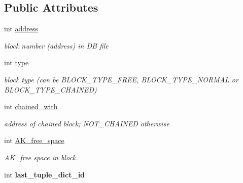 \subsection*{Public Attributes}
\begin{DoxyCompactItemize}
\item 
\mbox{\label{structAK__block_a72691b8b4db638181adadd02c0a9c6af}} 
int \hyperlink{structAK__block_a72691b8b4db638181adadd02c0a9c6af}{address}
\begin{DoxyCompactList}\small\item\em block number (address) in DB file \end{DoxyCompactList}\item 
\mbox{\label{structAK__block_a7bc611836789dc2b045d768432efe184}} 
int \hyperlink{structAK__block_a7bc611836789dc2b045d768432efe184}{type}
\begin{DoxyCompactList}\small\item\em block type (can be B\+L\+O\+C\+K\+\_\+\+T\+Y\+P\+E\+\_\+\+F\+R\+EE, B\+L\+O\+C\+K\+\_\+\+T\+Y\+P\+E\+\_\+\+N\+O\+R\+M\+AL or B\+L\+O\+C\+K\+\_\+\+T\+Y\+P\+E\+\_\+\+C\+H\+A\+I\+N\+ED) \end{DoxyCompactList}\item 
\mbox{\label{structAK__block_a56692ada02b24c08e3be44da8504ad9b}} 
int \hyperlink{structAK__block_a56692ada02b24c08e3be44da8504ad9b}{chained\+\_\+with}
\begin{DoxyCompactList}\small\item\em address of chained block; N\+O\+T\+\_\+\+C\+H\+A\+I\+N\+ED otherwise \end{DoxyCompactList}\item 
\mbox{\label{structAK__block_a5f3394eebe71ffc105b8f52af2155102}} 
int \hyperlink{structAK__block_a5f3394eebe71ffc105b8f52af2155102}{A\+K\+\_\+free\+\_\+space}
\begin{DoxyCompactList}\small\item\em A\+K\+\_\+free space in block. \end{DoxyCompactList}\item 
\mbox{\label{structAK__block_a6dcee13f6c5c80530ae1376e0f3a399f}} 
int {\bfseries last\+\_\+tuple\+\_\+dict\+\_\+id}
\item 
\mbox{\label{structAK__block_a291a49ea3dc9d972d3e1da46ba620903}} 

\end{DoxyCompactItemize}
